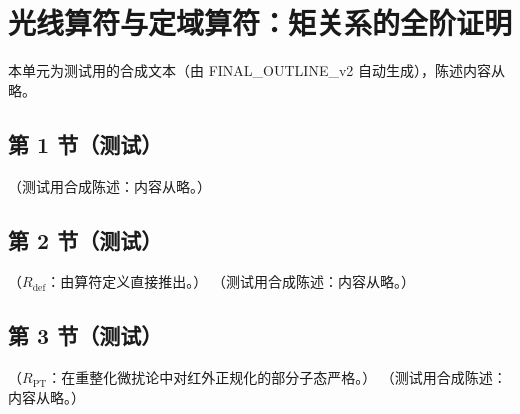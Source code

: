 \chapter{光线算符与定域算符：矩关系的全阶证明}\label{app:appL}
本单元为测试用的合成文本（由 FINAL\_OUTLINE\_v2 自动生成），陈述内容从略。

\section{第 1 节（测试）}\label{sec:appL-vertices}

\begin{lemma}[均差恒等式]\label{lem:appL-divided-differences}
（测试用合成陈述：内容从略。）
\end{lemma}

\section{第 2 节（测试）}\label{sec:appL-bare}

\begin{proposition}\label{prop:appL-bare}
（$R_{\mathrm{def}}$：由算符定义直接推出。）
（测试用合成陈述：内容从略。）
\end{proposition}

\section{第 3 节（测试）}\label{sec:appL-renormalized}

\begin{proposition}\label{prop:appL-renormalized}
（$R_{\mathrm{PT}}$：在重整化微扰论中对红外正规化的部分子态严格。）
（测试用合成陈述：内容从略。）
\end{proposition}
